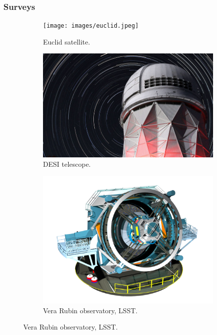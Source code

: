 \documentclass{beamer}
\makeatletter
\newcommand{\mylabel}{%
}
\makeatother
\begin{document}
\begin{frame}[plain,label=surveys]
    \frametitle{Surveys\mylabel}
    \begin{figure}
    	\centering
	\begin{subfigure}{0.29\textwidth}
        \texttt{[image: images/euclid.jpeg]}
	\caption{Euclid satellite.}
	\end{subfigure}
	\hfill
	\begin{subfigure}{0.4\textwidth}
        \includegraphics[width=\textwidth]{images/desi.png}
	\caption{DESI telescope.}
	\end{subfigure}
	\hfill
	\begin{subfigure}{0.39\textwidth}
        \includegraphics[width=\textwidth]{images/lsst.png}
	\caption{Vera Rubin observatory, LSST.}
	\end{subfigure}
    \end{figure}
\end{frame}
\end{document}
